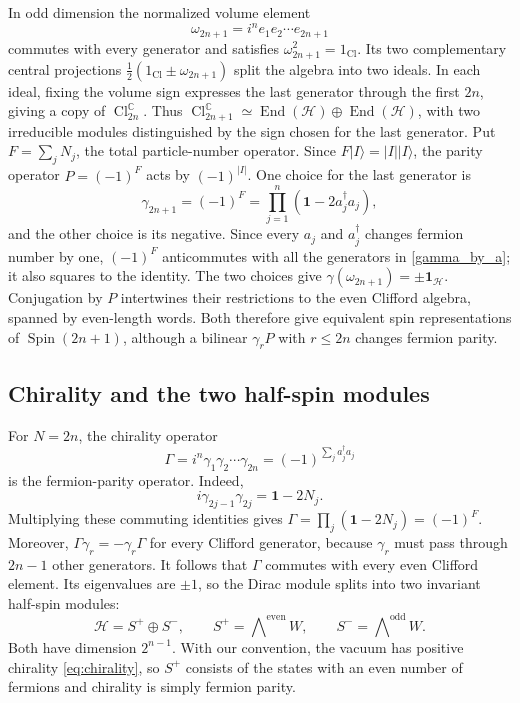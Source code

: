 \documentclass{article}
\theoremstyle{definition}
\theoremstyle{remark}
\newcommand{\C}{\mathbb C}
\newcommand{\Cl}{\operatorname{Cl}}
\newcommand{\End}{\operatorname{End}}
\newcommand{\Spin}{\operatorname{Spin}}
\newcommand{\ket}[1]{\lvert #1\rangle}
\begin{document}
In odd dimension the normalized volume element
\begin{equation*}
 \omega_{2n+1}=i^n e_1e_2\cdots e_{2n+1}
\end{equation*}
commutes with every generator and satisfies
$\omega_{2n+1}^2=1_{\Cl}$. Its two complementary central projections
$\frac12(1_{\Cl}\pm\omega_{2n+1})$ split the algebra into two ideals.
In each ideal, fixing the volume sign expresses the last generator through
the first $2n$, giving a copy of $\Cl_{2n}^\C$. Thus
$\Cl_{2n+1}^\C\simeq\End(\mathcal H)\oplus\End(\mathcal H)$, with two
irreducible modules distinguished by the sign chosen for the last
generator. Put $F=\sum_jN_j$, the total particle-number operator. Since
$F\ket I=|I|\ket I$, the parity operator $P=(-1)^F$ acts by $(-1)^{|I|}$.
One choice for the last generator is
\begin{equation}
 \gamma_{2n+1}
 =(-1)^F
 =\prod_{j=1}^n(\mathbf1-2a_j^\dagger a_j),
 \label{eq:parity-gamma}
\end{equation}
and the other choice is its negative.  Since every $a_j$ and
$a_j^\dagger$ changes fermion number by one, $(-1)^F$ anticommutes with
all the generators in \eqref{gamma_by_a}; it also squares to the identity.
The two choices give $\gamma(\omega_{2n+1})=\pm\mathbf1_{\mathcal H}$.
Conjugation by $P$ intertwines their restrictions to the even Clifford
algebra, spanned by even-length words. Both therefore give equivalent
spin representations of $\Spin(2n+1)$, although a bilinear $\gamma_rP$
with $r\le2n$ changes fermion parity.

\subsection{Chirality and the two half-spin modules}
\label{sec:chirality-half-spin}

For $N=2n$, the chirality operator
\begin{equation}
 \Gamma=i^n\gamma_1\gamma_2\cdots\gamma_{2n}
 =(-1)^{\sum_j a_j^\dagger a_j}
 \label{eq:chirality}
\end{equation}
is the fermion-parity operator. Indeed,
\begin{equation}
 i\gamma_{2j-1}\gamma_{2j}=\mathbf1-2N_j.
\end{equation}
Multiplying these commuting identities gives
$\Gamma=\prod_j(\mathbf1-2N_j)=(-1)^F$. Moreover,
$\Gamma\gamma_r=-\gamma_r\Gamma$ for every Clifford generator, because
$\gamma_r$ must pass through $2n-1$ other generators.  It follows that
$\Gamma$ commutes with every even Clifford element.  Its eigenvalues are
$\pm1$, so the Dirac module splits into two invariant half-spin modules:
\begin{equation}
 \mathcal H=S^+\oplus S^-,
 \qquad
 S^+=\bigwedge\nolimits^{\mathrm{even}}W,\qquad
 S^-=\bigwedge\nolimits^{\mathrm{odd}}W .
 \label{eq:half-spin}
\end{equation}
Both have dimension $2^{n-1}$.  With our convention, the vacuum has positive chirality 
\eqref{eq:chirality}, so $S^+$ consists of the states with an even number of fermions and chirality is simply fermion parity.
\end{document}
